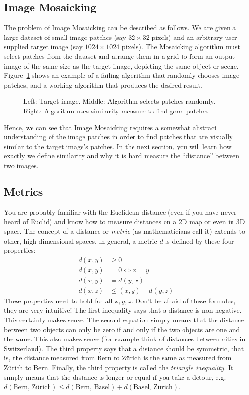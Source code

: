 \documentclass[a4paper]{article}
\begin{document}
	\subsection{Image Mosaicking}
		The problem of Image Mosaicking can be described as follows.
		We are given a large dataset of small image patches (say $32 \times 32$ pixels) and an arbitrary user-supplied target image (say $1024 \times 1024$ pixels).
		The Mosaicking algorithm must select patches from the dataset and arrange them in a grid to form an output image of the same size as the target image, depicting the same object or scene.
		Figure~\ref{fig:mosaicking-working-and-not-working} shows an example of a failing algorithm that randomly chooses image patches, and a working algorithm that produces the desired result.
		\begin{figure}
			\caption{
				Left: Target image. 
				Middle: Algorithm selects patches randomly. 
				Right: Algorithm uses similarity measure to find good patches.
			}
			\label{fig:mosaicking-working-and-not-working}
		\end{figure}
		Hence, we can see that Image Mosaicking requires a somewhat abstract understanding of the image patches in order to find patches that are visually similar to the target image's patches.
		In the next section, you will learn how exactly we define similarity and why it is hard measure the ``distance'' between two images.
		
	\subsection{Metrics}
		You are probably familiar with the Euclidean distance (even if you have never heard of Euclid) and know how to measure distances on a 2D map or even in 3D space. 
		The concept of a distance or \emph{metric} (as mathematicians call it) extends to other, high-dimensional spaces.
		In general, a metric $d$ is defined by these four properties:
		\begin{align}
			d(x, y) &\geq 0 \\
			d(x, y) &= 0 \iff x = y \\
			d(x, y) &= d(y, x) \\
			d(x, z) &\leq (x, y) + d(y, z) 
		\end{align}
		These properties need to hold for all $x, y, z$.
		Don't be afraid of these formulas, they are very intuitive!
		The first inequality says that a distance is non-negative. 
		This certainly makes sense.
		The second equation simply means that the distance between two objects can only be zero if and only if the two objects are one and the same.
		This also makes sense (for example think of distances between cities in Switzerland).
		The third property says that a distance should be symmetric, that is, the distance measured from Bern to Z\"urich is the same as measured from Z\"urich to Bern.
		Finally, the third property is called the \emph{triangle inequality}. 
		It simply means that the distance is longer or equal if you take a detour, e.g.\@ 
		$d(\text{Bern, Z\"urich}) \leq d(\text{Bern, Basel}) + d(\text{Basel, Z\"urich})$.
		
\end{document}
